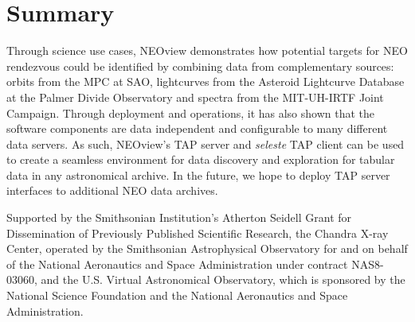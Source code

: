 \section{Summary}
Through science use cases, NEOview demonstrates how potential targets for NEO rendezvous could be identified by combining data from complementary sources: orbits from the MPC at SAO, lightcurves from the Asteroid Lightcurve Database at the Palmer Divide Observatory and spectra from the MIT-UH-IRTF Joint Campaign. Through deployment and operations, it has also shown that the software components are data independent and configurable to many different data servers. As such, NEOview's TAP server and \textit{seleste} TAP client can be used to create a seamless environment for data discovery and exploration for tabular data in any astronomical archive.  In the future, we hope to deploy TAP server interfaces to additional NEO data archives.

\acknowledgements Supported by the Smithsonian Institution's Atherton Seidell Grant for Dissemination of Previously Published Scientific Research, the Chandra X-ray Center, operated by the Smithsonian Astrophysical Observatory for and on behalf of the National Aeronautics and Space Administration under contract NAS8-03060, and the U.S. Virtual Astronomical Observatory, which is sponsored by the National Science Foundation and the National Aeronautics and Space Administration.



